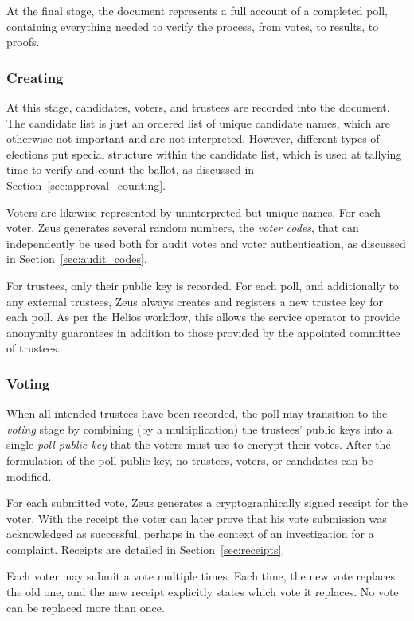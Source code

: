\documentclass[letterpaper,10pt]{article}
\begin{document}
At the final stage,
the document represents a full account of a completed poll,
containing everything needed to verify the process,
from votes, to results, to proofs.

\subsubsection{Creating}
\label{sec:creating}

At this stage, candidates, voters, and trustees
are recorded into the document.
The candidate list is just an ordered list of unique candidate names,
which are otherwise not important and are not interpreted.
However, different types of elections put special structure
within the candidate list, which is used at tallying time
to verify and count the ballot,
as discussed in Section~\ref{sec:approval_counting}.

Voters are likewise represented by uninterpreted but unique names.
For each voter,
Zeus generates several random numbers, the \emph{voter codes}, that can
independently be used both for audit votes and voter authentication,
as discussed in Section~\ref{sec:audit_codes}.

For trustees, only their public key is recorded.
For each poll, and additionally to any external trustees,
Zeus always creates and registers a new trustee key for each poll.
As per the Helios workflow, this allows the service operator to
provide anonymity guarantees in addition to those provided by
the appointed committee of trustees.

\subsubsection{Voting}
\label{sec:voting}
When all intended trustees have been recorded,
the poll may transition to the \emph{voting} stage
by combining (by a multiplication)
the trustees' public keys into a single \emph{poll public key}
that the voters must use to encrypt their votes.
After the formulation of the poll public key,
no trustees, voters, or candidates can be modified.

For each submitted vote, Zeus generates a cryptographically signed
receipt for the voter.
With the receipt the voter can later prove that
his vote submission was acknowledged as successful,
perhaps in the context of an investigation for a complaint.
Receipts are detailed in Section~\ref{sec:receipts}.

Each voter may submit a vote multiple times.
Each time, the new vote replaces the old one,
and the new receipt explicitly states which vote it replaces.
No vote can be replaced more than once.
\end{document}
